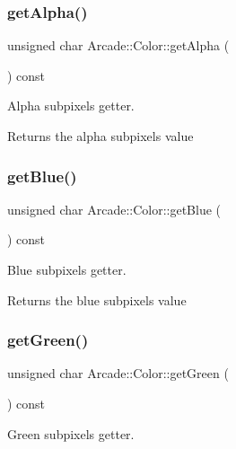 \subsubsection{\texorpdfstring{get\+Alpha()}{getAlpha()}}
{\footnotesize\ttfamily unsigned char Arcade\+::\+Color\+::get\+Alpha (\begin{DoxyParamCaption}{ }\end{DoxyParamCaption}) const}



Alpha subpixel\textquotesingle{}s getter. 

\begin{DoxyReturn}{Returns}
the alpha subpixel\textquotesingle{}s value 
\end{DoxyReturn}
\mbox{\label{class_arcade_1_1_color_adbdb9649465fbc18721ae679e2ef6eb3}} 
\subsubsection{\texorpdfstring{get\+Blue()}{getBlue()}}
{\footnotesize\ttfamily unsigned char Arcade\+::\+Color\+::get\+Blue (\begin{DoxyParamCaption}{ }\end{DoxyParamCaption}) const}



Blue subpixel\textquotesingle{}s getter. 

\begin{DoxyReturn}{Returns}
the blue subpixel\textquotesingle{}s value 
\end{DoxyReturn}
\mbox{\label{class_arcade_1_1_color_a1cb9e94a1205611e69dd0ac1ae9772d4}} 
\subsubsection{\texorpdfstring{get\+Green()}{getGreen()}}
{\footnotesize\ttfamily unsigned char Arcade\+::\+Color\+::get\+Green (\begin{DoxyParamCaption}{ }\end{DoxyParamCaption}) const}



Green subpixel\textquotesingle{}s getter. 

